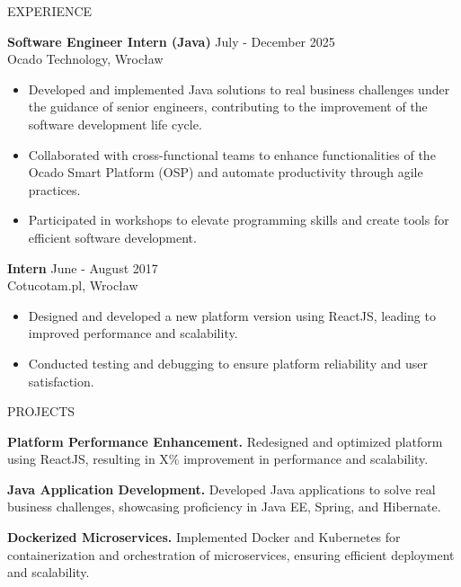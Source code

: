 \documentclass{resume} %
\begin{document}
\begin{rSection}{EXPERIENCE}

\textbf{Software Engineer Intern (Java)} \hfill July - December 2025\\
Ocado Technology, Wrocław
 \begin{itemize}
    \itemsep -3pt {} 
     \item Developed and implemented Java solutions to real business challenges under the guidance of senior engineers, contributing to the improvement of the software development life cycle.
     \item Collaborated with cross-functional teams to enhance functionalities of the Ocado Smart Platform (OSP) and automate productivity through agile practices.
    \item Participated in workshops to elevate programming skills and create tools for efficient software development.
 \end{itemize}
 
\textbf{Intern} \hfill June - August 2017\\
Cotucotam.pl, Wrocław
 \begin{itemize}
    \itemsep -3pt {} 
     \item Designed and developed a new platform version using ReactJS, leading to improved performance and scalability.
     \item Conducted testing and debugging to ensure platform reliability and user satisfaction.
 \end{itemize}

\end{rSection} 


\begin{rSection}{PROJECTS}
\vspace{-1.25em}
\item \textbf{Platform Performance Enhancement.} {Redesigned and optimized platform using ReactJS, resulting in X\% improvement in performance and scalability.}
\item \textbf{Java Application Development.} {Developed Java applications to solve real business challenges, showcasing proficiency in Java EE, Spring, and Hibernate.}
\item \textbf{Dockerized Microservices.} {Implemented Docker and Kubernetes for containerization and orchestration of microservices, ensuring efficient deployment and scalability.}
\end{rSection} 
\end{document}
